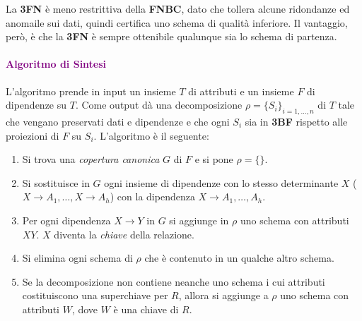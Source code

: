 La \textbf{3FN} è meno restrittiva della \textbf{FNBC}, dato che tollera alcune ridondanze ed anomaile sui dati,
quindi certifica uno schema di qualità inferiore. Il vantaggio, però, è che la \textbf{3FN} è sempre
ottenibile qualunque sia lo schema di partenza.

\paragraph{\textcolor{purple}{Algoritmo di Sintesi}} L'algoritmo prende in
input un insieme $T$ di attributi e un insieme $F$ di dipendenze su $T$. Come
output dà una decomposizione $\rho = \{S_i\}_{i = 1, \dots, n}$ di $T$ tale
che vengano preservati dati e dipendenze e che ogni $S_i$ sia in \textbf{3BF} rispetto
alle proiezioni di $F$ su $S_i$. L'algoritmo è il seguente:
\begin{enumerate}
    \item Si trova una \emph{copertura canonica} $G$ di $F$ e si pone
        $\rho = \{\}$.
    \item Si sostituisce in $G$ ogni insieme di dipendenze con lo stesso determinante
        $X$ ($X \rightarrow A_1, \dots, X \rightarrow A_h$) con la dipendenza $X \rightarrow A_1, \dots, A_h$.
    \item Per ogni dipendenza $X \rightarrow Y$ in $G$ si aggiunge in $\rho$ uno schema
        con attributi $XY$. $X$ diventa la \emph{chiave} della relazione.
    \item Si elimina ogni schema di $\rho$ che è contenuto in un qualche altro schema.
    \item Se la decomposizione non contiene neanche uno schema i cui attributi costituiscono
        una superchiave per $R$, allora si aggiunge a $\rho$ uno schema con attributi $W$,
        dove $W$ è una chiave di $R$.
\end{enumerate}